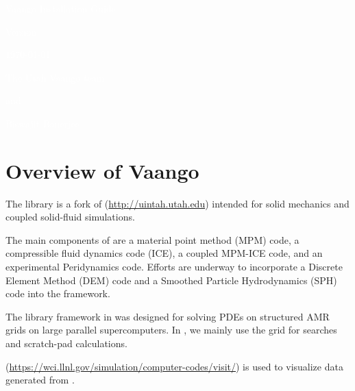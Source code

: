 \documentclass[11pt,fleqn]{book} %
\begin{document}
  \begingroup
    \thispagestyle{empty}
    \AddToShipoutPicture*{\BackgroundPic} %
    \centering
    \vspace*{1cm}
    \par\normalfont\fontsize{35}{35}\sffamily\selectfont
    \textcolor{white}{Vaango Installation Guide}\par %
    \vspace*{0.5cm}
    {\Large \textcolor{white}{Version \version}}\par
    {\Large \textcolor{white}{\today}}\par
    \vspace*{1cm}
    {\Large \textcolor{white}{The Utah Vaango team}}\par %
    {\Large \textcolor{white}{and}}\par %
    {\Large \textcolor{white}{Biswajit Banerjee}}\par %
  \endgroup

  

\chapter{Overview of Vaango} \label{sec:overview} 
The \Vaango library is a fork of \Uintah
(\url{http://uintah.utah.edu}) intended for solid mechanics and
coupled solid-fluid simulations.  

The main components of \Vaango
are a material point method (MPM) code, a compressible fluid dynamics
code (ICE), a coupled MPM-ICE code, and an experimental Peridynamics
code.  Efforts are underway to incorporate a Discrete Element Method (DEM)
code and a Smoothed Particle Hydrodynamics (SPH) code into the framework.

The library framework in \Uintah was designed for solving PDEs on 
structured AMR grids on large parallel supercomputers.  In \Vaango, we
mainly use the grid for searches and scratch-pad calculations.

\Visit (\url{https://wci.llnl.gov/simulation/computer-codes/visit/})
is used to visualize data generated from \Vaango.
\end{document}
